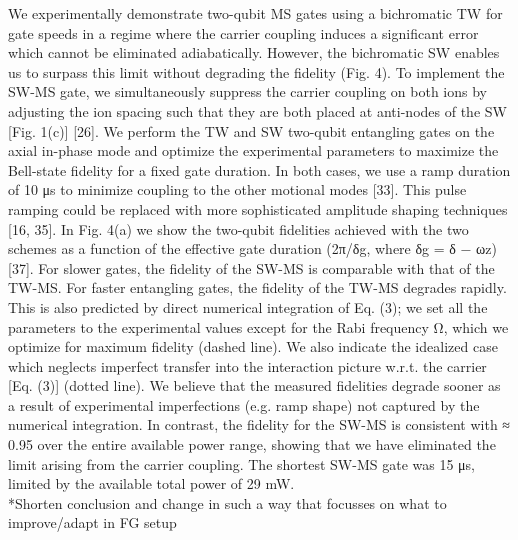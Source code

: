 \documentclass[12pt]{iopart}
\begin{document}
    We experimentally demonstrate two-qubit MS gates using a bichromatic
    TW for gate speeds in a regime where the carrier coupling induces a
    significant error which cannot be eliminated adiabatically. However,
    the bichromatic SW enables us to surpass this limit without degrading
    the fidelity (Fig. 4). To implement the SW-MS gate, we simultaneously
    suppress the carrier coupling on both ions by adjusting the ion
    spacing such that they are both placed at anti-nodes of the SW
    [Fig. 1(c)] [26]. We perform the TW and SW two-qubit entangling gates
    on the axial in-phase mode and optimize the experimental parameters to
    maximize the Bell-state fidelity for a fixed gate duration. In both
    cases, we use a ramp duration of 10 μs to minimize coupling to the
    other motional modes [33]. This pulse ramping could be replaced with
    more sophisticated amplitude shaping techniques [16, 35]. In Fig. 4(a)
    we show the two-qubit fidelities achieved with the two schemes as a
    function of the effective gate duration (2π/δg, where δg = δ − ωz)
    [37]. For slower gates, the fidelity of the SW-MS is comparable with
    that of the TW-MS. For faster entangling gates, the fidelity of the
    TW-MS degrades rapidly. This is also predicted by direct numerical
    integration of Eq. (3); we set all the parameters to the experimental
    values except for the Rabi frequency Ω, which we optimize for maximum
    fidelity (dashed line). We also indicate the idealized case which
    neglects imperfect transfer into the interaction picture w.r.t. the
    carrier [Eq. (3)] (dotted line). We believe that the measured
    fidelities degrade sooner as a result of experimental imperfections
    (e.g. ramp shape) not captured by the numerical integration. In
    contrast, the fidelity for the SW-MS is consistent with ≈ 0.95 over
    the entire available power range, showing that we have eliminated the
    limit arising from the carrier coupling. The shortest SW-MS gate was
    15 μs, limited by the available total power of 29 mW. \\

    *Shorten conclusion and change in such a way that focusses on what to
    improve/adapt in FG setup\\
\end{document}
